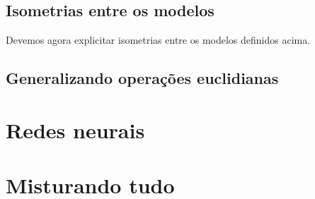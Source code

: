 \documentclass{article}
\begin{document}
\subsection{Isometrias entre os modelos}

Devemos agora explicitar isometrias entre os modelos definidos acima.

\subsection{Generalizando operações euclidianas}



\section{Redes neurais}

\section{Misturando tudo}

\nocite{*}
\printbibliography
\end{document}
